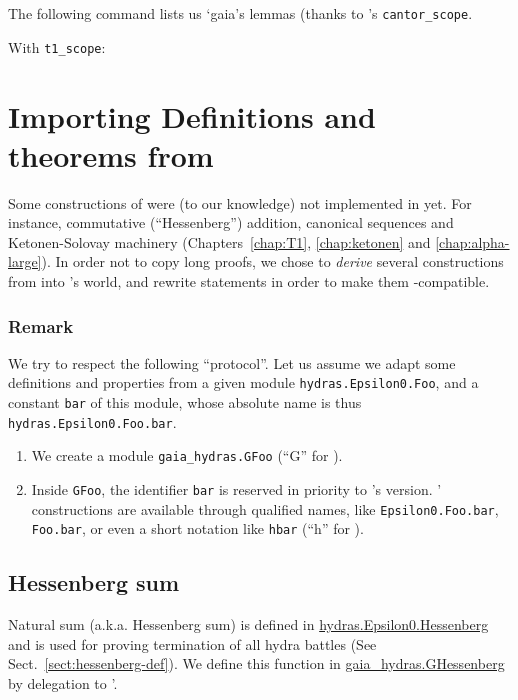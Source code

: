 The following command lists us `gaia's lemmas (thanks to
\gaia's  \texttt{cantor\_scope}.

With \texttt{t1\_scope}:


\section{Importing Definitions and theorems from \HydrasLib}

Some constructions of \HydrasLib were (to our knowledge) not implemented in \gaia yet. For instance, commutative (``Hessenberg'') addition, canonical sequences and Ketonen-Solovay machinery (Chapters~\ref{chap:T1}, \ref{chap:ketonen} and \ref{chap:alpha-large}). In order not to copy long proofs, we chose to
\emph{derive} several constructions from \HydrasLib into \gaia's world, and rewrite \HydrasLib statements in order to make them \gaia-compatible.


\subsubsection{Remark}
\label{sect:gaia-masking}
We try to respect the following ``protocol''.
Let us assume we adapt some definitions and properties
from a given module \texttt{hydras.Epsilon0.Foo}, and a constant \texttt{bar} of this module, whose absolute name is
thus \texttt{hydras.Epsilon0.Foo.bar}.
\begin{enumerate}
\item We create a module \texttt{gaia\_hydras.GFoo}
  (``G'' for \gaia).
\item Inside \texttt{GFoo}, the identifier \texttt{bar}
  is reserved in priority to \gaia's version.
\HydrasLib' constructions are available through qualified names, like \texttt{Epsilon0.Foo.bar}, \texttt{Foo.bar}, or even a short notation like \texttt{hbar}  (``h'' for \HydrasLib).
\end{enumerate}

\subsection{Hessenberg sum}
Natural sum  (a.k.a. Hessenberg  sum) is defined in
\href{../theories/html/hydras.Epsilon0.Hessenberg.html}{hydras.Epsilon0.Hessenberg} and is used for proving termination of all hydra battles (See Sect.~\ref{sect:hessenberg-def}).
We define this function in \href{../theories/html/gaia\_hydras.GHessenberg.html}{gaia\_hydras.GHessenberg} by delegation to \HydrasLib'.

